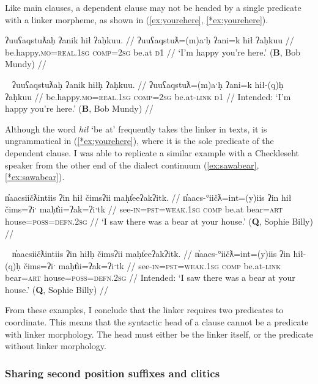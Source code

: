Like main clauses, a dependent clause may not be headed by a single predicate with a linker morpheme, as shown in (\ref{ex:yourehere}, \ref{*ex:yourehere}).

\ex \label{ex:yourehere}
\begingl
\glpreamble ʔuuʕaqstuƛaḥ ʔanik hił ʔaḥkuu. //
\gla ʔuuʕaqstuƛ=(m)aˑḥ ʔani=k hił ʔaḥkuu //
\glb be.happy.\textsc{mo}=\textsc{real.1sg} \textsc{comp}=\textsc{2sg} be.at \textsc{d1} //
\glft `I'm happy you're here.' (\textbf{B}, Bob Mundy) //
\endgl
\xe

\ex~ \label{*ex:yourehere}
\begingl
\glpreamble *ʔuuʕaqstuƛaḥ ʔanik hiłḥ ʔaḥkuu. //
\gla ʔuuʕaqstuƛ=(m)aˑḥ ʔani=k hił-(q)ḥ ʔaḥkuu //
\glb be.happy.\textsc{mo}=\textsc{real.1sg} \textsc{comp}=\textsc{2sg} be.at-\textsc{link} \textsc{d1} //
\glft Intended: `I'm happy you're here.' (\textbf{B}, Bob Mundy) //
\endgl
\xe

Although the word \textit{hił} `be at' frequently takes the linker in texts, it is ungrammatical in (\ref{*ex:yourehere}), where it is the sole predicate of the dependent clause. I was able to replicate a similar example with a Checkleseht speaker from the other end of the dialect continuum (\ref{ex:sawabear}, \ref{*ex:sawabear}).

\ex \label{ex:sawabear}
\begingl
\glpreamble n̓aacsiičƛintiis ʔin hił čimsʔii maḥt̓eeʔakʔitk. //
\gla n̓aacs-°iičƛ=int=(y)iis ʔin hił čims=ʔiˑ maḥt̓ii=ʔak=ʔiˑtk //
\glb see-\textsc{in}=\textsc{pst}=\textsc{weak.1sg} \textsc{comp} be.at bear=\textsc{art} house=\textsc{poss}=\textsc{defn.2sg} //
\glft `I saw there was a bear at your house.' (\textbf{Q}, Sophie Billy) //
\endgl
\xe

\ex~ \label{*ex:sawabear}
\begingl
\glpreamble *n̓aacsiičƛintiis ʔin hiłḥ čimsʔii maḥt̓eeʔakʔitk. //
\gla n̓aacs-°iičƛ=int=(y)iis ʔin hił-(q)ḥ čims=ʔiˑ maḥt̓ii=ʔak=ʔiˑtk //
\glb see-\textsc{in}=\textsc{pst}=\textsc{weak.1sg} \textsc{comp} be.at-\textsc{link} bear=\textsc{art} house=\textsc{poss}=\textsc{defn.2sg} //
\glft Intended: `I saw there was a bear at your house.' (\textbf{Q}, Sophie Billy) //
\endgl
\xe

From these examples, I conclude that the linker requires two predicates to coordinate. This means that the syntactic head of a clause cannot be a predicate with linker morphology. The head must either be the linker itself, or the predicate without linker morphology.

\subsubsection{Sharing second position suffixes and clitics} \label{sec:link:second}

